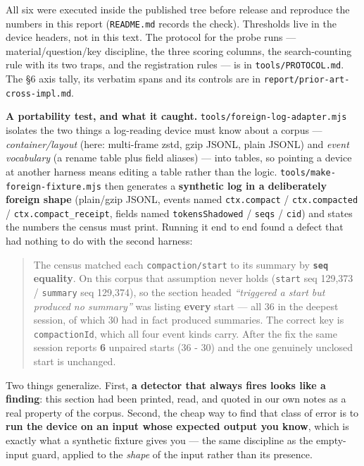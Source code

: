 \documentclass[
]{article}
\begin{document}
All six were executed inside the published tree before release and
reproduce the numbers in this report (\texttt{README.md} records the
check). Thresholds live in the device headers, not in this text. The
protocol for the probe runs --- material/question/key discipline, the
three scoring columns, the search-counting rule with its two traps, and
the registration rules --- is in \texttt{tools/PROTOCOL.md}. The §6 axis
tally, its verbatim spans and its controls are in
\texttt{report/prior-art-cross-impl.md}.

\textbf{A portability test, and what it caught.}
\texttt{tools/foreign-log-adapter.mjs} isolates the two things a
log-reading device must know about a corpus --- \emph{container/layout}
(here: multi-frame zstd, gzip JSONL, plain JSONL) and \emph{event
vocabulary} (a rename table plus field aliases) --- into tables, so
pointing a device at another harness means editing a table rather than
the logic. \texttt{tools/make-foreign-fixture.mjs} then generates a
\textbf{synthetic log in a deliberately foreign shape} (plain/gzip
JSONL, events named \texttt{ctx.compact} / \texttt{ctx.compacted} /
\texttt{ctx.compact\_receipt}, fields named \texttt{tokensShadowed} /
\texttt{seqs} / \texttt{cid}) and states the numbers the census must
print. Running it end to end found a defect that had nothing to do with
the second harness:

\begin{quote}
The census matched each \texttt{compaction/start} to its summary by
\textbf{\texttt{seq} equality}. On this corpus that assumption never
holds (\texttt{start} seq 129,373 / \texttt{summary} seq 129,374), so
the section headed \emph{``triggered a start but produced no summary''}
was listing \textbf{every} start --- all 36 in the deepest session, of
which 30 had in fact produced summaries. The correct key is
\texttt{compactionId}, which all four event kinds carry. After the fix
the same session reports \textbf{6} unpaired starts (36 - 30) and the
one genuinely unclosed start is unchanged.
\end{quote}

Two things generalize. First, \textbf{a detector that always fires looks
like a finding}: this section had been printed, read, and quoted in our
own notes as a real property of the corpus. Second, the cheap way to
find that class of error is to \textbf{run the device on an input whose
expected output you know}, which is exactly what a synthetic fixture
gives you --- the same discipline as the empty-input guard, applied to
the \emph{shape} of the input rather than its presence.
\end{document}
